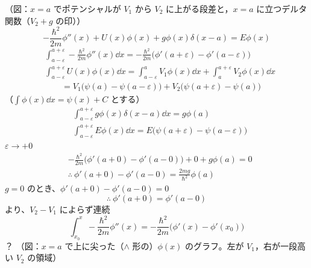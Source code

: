 （図：$x=a$ でポテンシャルが $V_{1}$ から $V_{2}$ に上がる段差と，$x=a$ に立つデルタ関数（$V_{2}+g$ の印））
\[ -\frac{\hbar^{2}}{2m}\phi''(x)+U(x)\phi(x)+g\phi(x)\delta(x-a)=E\phi(x) \]
\begin{align*}
&\int_{a-\varepsilon}^{a+\varepsilon}-\frac{\hbar^{2}}{2m}\phi''(x)\dd x=-\frac{\hbar^{2}}{2m}\bigl(\phi'(a+\varepsilon)-\phi'(a-\varepsilon)\bigr)\\
&\int_{a-\varepsilon}^{a+\varepsilon}U(x)\phi(x)\dd x=\int_{a-\varepsilon}^{a}V_{1}\phi(x)\dd x+\int_{a}^{a+\varepsilon}V_{2}\phi(x)\dd x\\
&\qquad=V_{1}\bigl(\psi(a)-\psi(a-\varepsilon)\bigr)+V_{2}\bigl(\psi(a+\varepsilon)-\psi(a)\bigr)
\end{align*}
（$\int\phi(x)\dd x=\psi(x)+C$ とする）
\begin{align*}
&\int_{a-\varepsilon}^{a+\varepsilon}g\phi(x)\delta(x-a)\dd x=g\phi(a)\\
&\int_{a-\varepsilon}^{a+\varepsilon}E\phi(x)\dd x=E\bigl(\psi(a+\varepsilon)-\psi(a-\varepsilon)\bigr)
\end{align*}
$\varepsilon\to+0$
\begin{align*}
&-\frac{\hbar^{2}}{2m}\bigl(\phi'(a+0)-\phi'(a-0)\bigr)+0+g\phi(a)=0\\
&\therefore\ \phi'(a+0)-\phi'(a-0)=\frac{2mg}{\hbar^{2}}\phi(a)
\end{align*}
$g=0$ のとき、$\phi'(a+0)-\phi'(a-0)=0$
\[ \therefore\ \phi'(a+0)=\phi'(a-0) \]
より、$V_{2}-V_{1}$ によらず連続
\[ \int_{x_{0}}^{x}-\frac{\hbar^{2}}{2m}\phi''(x)=-\frac{\hbar^{2}}{2m}\bigl(\phi'(x)-\phi'(x_{0})\bigr) \]
？
（図：$x=a$ で上に尖った（$\wedge$ 形の）$\phi(x)$ のグラフ。左が $V_{1}$，右が一段高い $V_{2}$ の領域）
